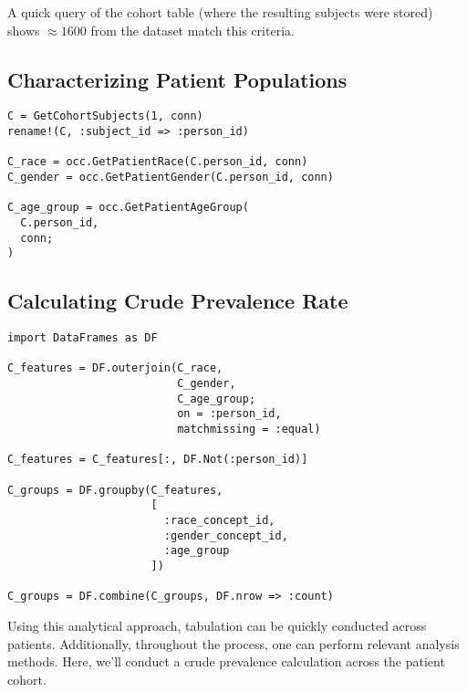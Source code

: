 \documentclass{juliacon}
\begin{document}
A quick query of the cohort table (where the resulting subjects were stored) shows $\approx 1600$ from the dataset match this criteria.

\subsection{Characterizing Patient Populations}

\begin{verbatim}
C = GetCohortSubjects(1, conn)
rename!(C, :subject_id => :person_id)

C_race = occ.GetPatientRace(C.person_id, conn)
C_gender = occ.GetPatientGender(C.person_id, conn)

C_age_group = occ.GetPatientAgeGroup(
  C.person_id, 
  conn; 
)
\end{verbatim}

\subsection{Calculating Crude Prevalence Rate}

\begin{verbatim}
import DataFrames as DF

C_features = DF.outerjoin(C_race,
                          C_gender,
                          C_age_group;
                          on = :person_id, 
                          matchmissing = :equal)

C_features = C_features[:, DF.Not(:person_id)]

C_groups = DF.groupby(C_features, 
                      [
                        :race_concept_id, 
                        :gender_concept_id, 
                        :age_group
                      ])

C_groups = DF.combine(C_groups, DF.nrow => :count)
\end{verbatim}

Using this analytical approach, tabulation can be quickly conducted across patients.
Additionally, throughout the process, one can perform relevant analysis methods.
Here, we'll conduct a crude prevalence calculation across the patient cohort.
\end{document}
